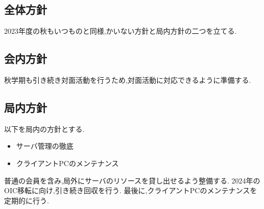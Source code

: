 \subsection*{全体方針}


2023年度の秋もいつものと同様,かいない方針と局内方針の二つを立てる.

\subsection*{会内方針}
秋学期も引き続き対面活動を行うため,対面活動に対応できるように準備する.

\subsection*{局内方針}
以下を局内の方針とする.
\begin{itemize}
    \item サーバ管理の徹底
    \item クライアントPCのメンテナンス
\end{itemize}
普通の会員を含み,局外にサーバのリソースを貸し出せるよう整備する.
2024年のOIC移転に向け,引き続き回収を行う.
最後に,クライアントPCのメンテナンスを定期的に行う.
